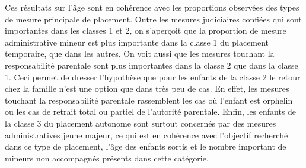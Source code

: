 \documentclass[
  12,
  a4paper,
]{report}
\begin{document}
Ces résultats sur l'âge sont en cohérence avec les proportions observées
des types de mesure principale de placement. Outre les mesures
judiciaires confiées qui sont importantes dans les classes 1 et 2, on
s'aperçoit que la proportion de mesure administrative mineur est plus
importante dans la classe 1 du placement temporaire, que dans les
autres. On voit aussi que les mesures touchant la responsabilité
parentale sont plus importantes dans la classe 2 que dans la classe 1.
Ceci permet de dresser l'hypothèse que pour les enfants de la classe 2
le retour chez la famille n'est une option que dans très peu de cas. En
effet, les mesures touchant la responsabilité parentale rassemblent les
cas où l'enfant est orphelin ou les cas de retrait total ou partiel de
l'autorité parentale. Enfin, les enfants de la classe 3 du placement
autonome sont surtout concernés par des mesures administratives jeune
majeur, ce qui est en cohérence avec l'objectif recherché dans ce type
de placement, l'âge des enfants sortis et le nombre important de mineurs
non accompagnés présents dans cette catégorie.
\end{document}
